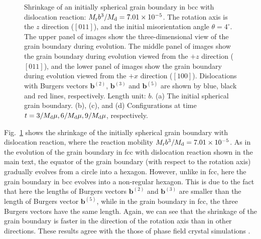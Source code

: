 \documentclass[smallextended]{svjour3}
\begin{document}
\begin{figure}[htbp]
\centering
{}
	\caption{Shrinkage of an initially spherical grain boundary in bcc with dislocation reaction: $M_{\rm r}b^3/M_{\rm d}=7.01\times10^{-5}$. The rotation axis is the $z$ direction ($[011]$), and the initial misorientation angle $\theta=4^\circ$. The upper panel of images show the three-dimensional view of the grain boundary during evolution. The middle panel of images show the grain boundary during evolution viewed from the $+z$ direction ($[011]$), and the lower panel of images show the grain boundary during evolution viewed from the $+x$ direction ($[100]$). Dislocations with Burgers vectors $\mathbf b^{(2)}$, $\mathbf b^{(3)}$ and $\mathbf b^{(5)}$ are shown by blue, black and red lines, respectively. Length unit: $b$. (a) The initial spherical grain boundary. (b), (c), and (d) Configurations at time $t=3/M_{\rm d}\mu, 6/M_{\rm d}\mu, 9/M_{\rm d}\mu$, respectively.}\label{fig:bccfigure}
\end{figure}


Fig.~\ref{fig:bccfigure} shows the shrinkage of the initially spherical grain boundary with dislocation reaction, where the reaction mobility  $M_{\rm r}b^3/M_{\rm d}=7.01\times10^{-5}$. As in the evolution of the grain boundary in fcc with dislocation reaction shown in the main text, the equator of the grain boundary (with respect to the rotation axis) gradually evolves from a circle into a hexagon. However, unlike  in fcc, here the grain boundary in bcc evolves into a non-regular hexagon. This is due to the fact that here the lengths of Burgers vectors  $\mathbf b^{(2)}$ and $\mathbf b^{(3)}$ are smaller than the length of Burgers vector $\mathbf b^{(5)}$, while in the grain boundary in fcc, the three Burgers vectors have the same length.
Again, we can see that the shrinkage of the grain boundary is faster in the direction of the rotation axis than in other directions. These results  agree with the those of phase field crystal simulations \cite{yamanaka2017phase}.
\end{document}
